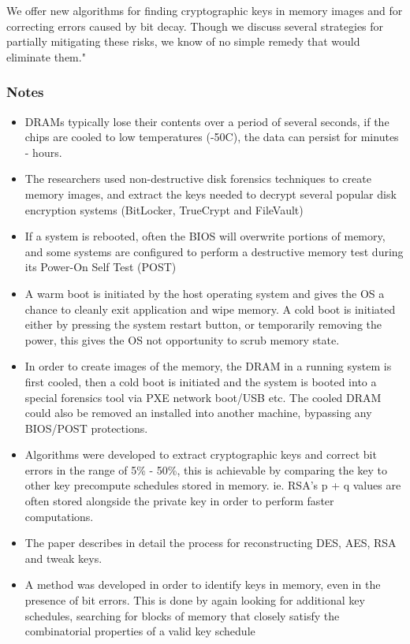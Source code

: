 \documentclass[12pt, a4paper]{article}
\begin{document}
\begin{multicols*}{2}
We offer new algorithms for finding cryptographic keys in memory images and for correcting errors caused by bit decay.
Though we discuss several strategies for partially mitigating these risks, we know of no simple remedy that would eliminate them."

\subsubsection{Notes}
\begin{itemize}
	\item DRAMs typically lose their contents over a period of several seconds, if the chips are cooled to low temperatures (-50\degree C), the data can persist for minutes - hours.
	\item The researchers used non-destructive disk forensics techniques to create memory images, and extract the keys needed to decrypt several popular disk encryption systems (BitLocker, TrueCrypt and FileVault)
	\item If a system is rebooted, often the BIOS will overwrite portions of memory, and some systems are configured to perform a destructive memory test during its Power-On Self Test (POST)
	\item A warm boot is initiated by the host operating system and gives the OS a chance to cleanly exit application and wipe memory.
	A cold boot is initiated either by pressing the system restart button, or temporarily removing the power, this gives the OS not opportunity to scrub memory state.
	\item In order to create images of the memory, the DRAM in a running system is first cooled, then a cold boot is initiated and the system is booted into a special forensics tool via PXE network boot/USB etc. The cooled DRAM could also be removed an installed into another machine, bypassing any BIOS/POST protections.
	\item Algorithms were developed to extract cryptographic keys and correct bit errors in the range of 5\% - 50\%, this is achievable by comparing the key to other key precompute schedules stored in memory. ie. RSA's p + q values are often stored alongside the private key in order to perform faster computations.
	\item The paper describes in detail the process for reconstructing DES, AES, RSA and tweak keys.
	\item A method was developed in order to identify keys in memory, even in the presence of bit errors. This is done by again looking for additional key schedules, searching for blocks of memory that closely satisfy the combinatorial properties of a valid key schedule

\end{itemize}
\end{multicols*}
\end{document}
